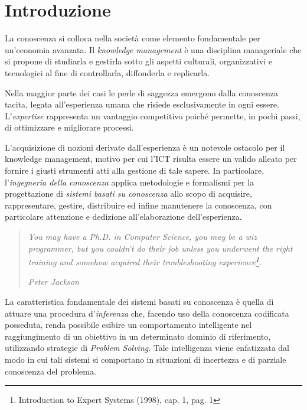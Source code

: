 
\chapter{Introduzione}

    
La conoscenza si colloca nella società come elemento fondamentale per un'economia avanzata. Il \emph{knowledge management} è una disciplina manageriale che si propone di studiarla e gestirla sotto gli aspetti culturali, organizzativi e tecnologici al fine di controllarla, diffonderla e replicarla.

Nella maggior parte dei casi le perle di saggezza emergono dalla conoscenza tacita, legata all'esperienza umana che risiede esclusivamente in ogni essere. L'\emph{expertise} rappresenta un vantaggio competitivo poiché permette, in pochi passi, di ottimizzare e migliorare processi.

L'acquisizione di nozioni derivate dall'esperienza è un notevole ostacolo per il knowledge management, motivo per cui l'ICT risulta essere un valido alleato per fornire i giusti strumenti atti alla gestione di tale sapere. In particolare, l'\emph{ingegneria della conoscenza} applica metodologie e formalismi per la progettazione di \emph{sistemi basati su conoscenza} allo scopo di acquisire, rappresentare, gestire, distribuire ed infine manutenere la conoscenza, con particolare attenzione e dedizione all'elaborazione dell'esperienza.

\begin{quotation}
\noindent \em You may have a Ph.D. in Computer Science, you may be a wiz programmer, but you couldn't do their job unless you underwent the right training and somehow acquired their troubleshooting experience\footnote{Introduction to Expert Systems (1998), cap. 1, pag. 1}.

\em Peter Jackson
\end{quotation}


La caratteristica fondamentale dei sistemi basati su conoscenza è quella di attuare una procedura d'\emph{inferenza} che, facendo uso della conoscenza codificata posseduta, renda possibile esibire un comportamento intelligente nel raggiungimento di un obiettivo in un determinato dominio di riferimento, utilizzando strategie di \emph{Problem Solving}. Tale intelligenza viene enfatizzata dal modo in cui tali sistemi si comportano in situazioni di incertezza e di parziale conoscenza del problema.

